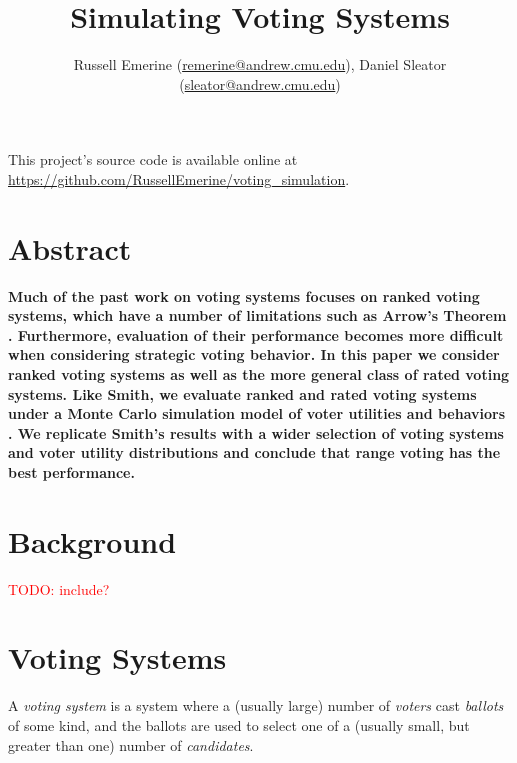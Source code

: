 \documentclass[11pt]{article}
\begin{document}
    \setlength{\parindent}{0pt}
    \setlength{\parskip}{5pt}
    \setlength{\headheight}{14.49999pt}
    \addtolength{\topmargin}{-1.59999pt}

    \title{Simulating Voting Systems}
    \author{\normalsize{Russell Emerine (\url{remerine@andrew.cmu.edu}), Daniel Sleator (\url{sleator@andrew.cmu.edu})}}
    \date{}

    \maketitle

    This project's source code is available online at \url{https://github.com/RussellEmerine/voting_simulation}.


    \section{Abstract}\label{sec:abstract}

    \textbf{
        Much of the past work on voting systems focuses on ranked voting systems,
        which have a number of limitations such as Arrow's Theorem \cite{Arrow}.
        Furthermore, evaluation of their performance becomes more difficult when considering strategic voting behavior.
        In this paper we consider ranked voting systems as well as the more general class of rated voting systems.
        Like Smith, we evaluate ranked and rated voting systems
        under a Monte Carlo simulation model of voter utilities and behaviors \cite{Smith}.
        We replicate Smith's results with a wider selection of voting systems and voter utility distributions
        and conclude that range voting has the best performance.
    }


    \section{Background}\label{sec:background}

    \textcolor{red}{TODO: include?}


    \section{Voting Systems}\label{sec:voting-systems}

    A \textit{voting system} is a system where
    a (usually large) number of \textit{voters} cast \textit{ballots} of some kind,
    and the ballots are used to select one of
    a (usually small, but greater than one) number of \textit{candidates}.
\end{document}
